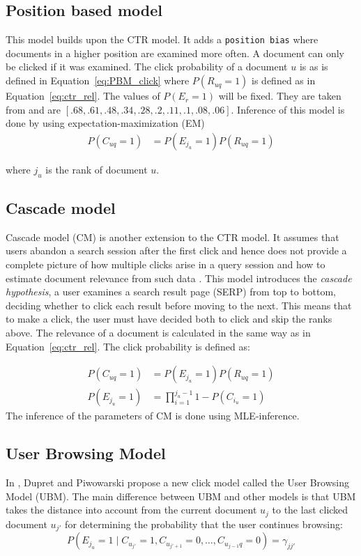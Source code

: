 \subsection{Position based model}
This model builds upon the CTR model. It adds a \texttt{position bias} where documents in a higher position are examined more often. A document can only be clicked if it was examined. The click probability of a document $u$ is as is defined in Equation~\ref{eq:PBM_click} where $P(R_{uq}=1)$ is defined as in Equation~\ref{eq:ctr_rel}. The values of $P(E_r=1)$ will be fixed. They are taken from \cite{eye_track} and are $[.68, .61, .48, .34, .28, .2, .11, .1, .08, .06]$. Inference of this model is done by using expectation-maximization (EM)
\begin{align}
	P(C_{uq}=1) &= P(E_{j_u}=1)P(R_{uq}=1) \label{eq:PBM_click}
\end{align}

where $j_u$ is the rank of document $u$.

\subsection{Cascade model}
Cascade model (CM) is another extension to the CTR model. It assumes that users abandon a search session after the first click and hence does not provide a complete picture of how multiple clicks arise in a query session and how to estimate document relevance from such data \cite{Kempe2008,Craswell2008}. This model introduces the \textit{cascade hypothesis}, a user examines a search result page (SERP) from top to bottom, deciding whether to click each result before moving to the next. This means that to make a click, the user must have decided both to click and skip the ranks above. The relevance of a document is calculated in the same way as in Equation~\ref{eq:ctr_rel}. The click probability is defined as:

\begin{align}
	P(C_{uq}=1) &= P(E_{j_u}=1)P(R_{uq}=1) \label{eq:CM_click} \\
	P(E_{j_u}=1) &= \prod_{i=1}^{j_u-1} 1 - P(C_{i_u}=1) \nonumber
\end{align}
The inference of the parameters of CM is done using MLE-inference.

\subsection{User Browsing Model}
In \cite{Dupret2008}, Dupret and Piwowarski propose a new click model called the User Browsing Model (UBM). The main difference between UBM and other models is that UBM takes the distance into account from the current document \(u_j\) to the last clicked document \(u_{j'}\) for determining the probability that the user continues browsing:
\[P(E_{j_u} = 1 \mid C_{u_{j'}}=1, C_{u_{j'+1}}=0, \dots, C_{u_{j-1}q}=0) = \gamma_{jj'}\]

